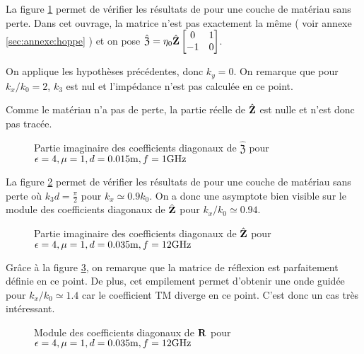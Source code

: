         La figure \ref{fig:imp_fourier:plan:hoppe} permet de vérifier les résultats de \cite[p.~33]{hoppe_impedance_1995} pour une couche de matériau sans perte. Dans cet ouvrage, la matrice n’est pas exactement la même ( voir annexe \ref{sec:annexe:hoppe} ) et on pose \(\hat{\mathfrak{Z}} = \eta_0\hat{\mathbf{Z}}\begin{bmatrix}0&1\\-1&0\end{bmatrix}\).

        On applique les hypothèses précédentes, donc \(k_y=0\). On remarque que pour \(k_x\slash k_0=2\), \(k_3\) est nul et l'impédance n'est pas calculée en ce point. 

        Comme le matériau n'a pas de perte, la partie réelle de \(\hat{\mathfrak{\mathbf{Z}}}\) est nulle et n'est donc pas tracée.

        \begin{figure}[!hbt]
            \centering
            
            \caption[Reproduction résultat Hoppe & Rahmat-Samii p.~33]{Partie imaginaire des coefficients diagonaux de \(\hat{\mathfrak Z}\) pour \(\epsilon = 4, \mu = 1, d=0.015\text{m}, f=1\text{GHz}\)}
            \label{fig:imp_fourier:plan:hoppe}
        \end{figure}

        La figure \ref{fig:imp_fourier:plan:soudais} permet de vérifier les résultats de \cite{soudais_3d_2017} pour une couche de matériau sans perte où \(k_3d = \frac{\pi}{2}\) pour \(k_x \simeq 0.9 k_0\). On a donc une asymptote bien visible sur le module des coefficients diagonaux de \(\hat{\mathbf{Z}}\) pour \(k_x\slash k_0 \simeq 0.94\).

        \begin{figure}[!hbt]
            \centering
            
            \caption[Reproduction résultat P. Soudais p.~11]{Partie imaginaire des coefficients diagonaux de \(\hat{\mathbf{Z}}\) pour \(\epsilon = 4, \mu = 1, d=0.035\text{m}, f=12\text{GHz}\)}
            \label{fig:imp_fourier:plan:soudais}
        \end{figure}


        Grâce à la figure \ref{fig:reflex_fourier:plan:soudais}, on remarque que la matrice de réflexion est parfaitement définie en ce point. De plus, cet empilement permet d'obtenir une onde guidée pour \(k_x\slash k_0 \simeq 1.4\) car le coefficient TM diverge en ce point. C'est donc un cas très intéressant.

        \begin{figure}[!hbt]
            \centering
            
            \caption[Reproduction résultat P. Soudais p.~11]{Module des coefficients diagonaux de \(\mathbf{R}\) pour \(\epsilon = 4, \mu = 1, d=0.035\text{m}, f=12\text{GHz}\)}
            \label{fig:reflex_fourier:plan:soudais}
        \end{figure}



